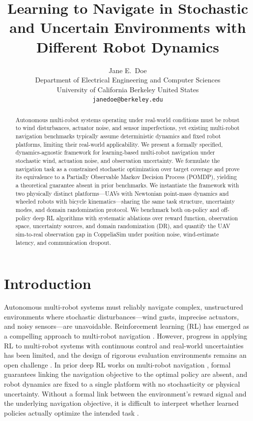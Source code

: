 \documentclass{article}
\title{Learning to Navigate in Stochastic and Uncertain Environments with Different Robot Dynamics}
\author{
  Jane E.~Doe\\
  Department of Electrical Engineering and Computer Sciences\\
  University of California Berkeley
  United States\\
  \texttt{janedoe@berkeley.edu} \\
}
\begin{document}
\maketitle
\thispagestyle{empty}
\pagestyle{empty}


\begin{abstract}
Autonomous multi-robot systems operating under real-world conditions must be robust to wind disturbances, actuator noise, and sensor imperfections, yet existing multi-robot navigation benchmarks typically assume deterministic dynamics and fixed robot platforms, limiting their real-world applicability. We present a formally specified, dynamics-agnostic framework for learning-based multi-robot navigation under stochastic wind, actuation noise, and observation uncertainty. We formulate the navigation task as a constrained stochastic optimization over target coverage and prove its equivalence to a Partially Observable Markov Decision Process (POMDP), yielding a theoretical guarantee absent in prior benchmarks. We instantiate the framework with two physically distinct platforms---UAVs with Newtonian point-mass dynamics and wheeled robots with bicycle kinematics---sharing the same task structure, uncertainty modes, and domain randomization protocol. We benchmark both on-policy and off-policy deep RL algorithms with systematic ablations over reward function, observation space, uncertainty sources, and domain randomization (DR), and quantify the UAV sim-to-real observation gap in CoppeliaSim under position noise, wind-estimate latency, and communication dropout.
\end{abstract}


\section{Introduction}

Autonomous multi-robot systems must reliably navigate complex, unstructured environments where stochastic disturbances---wind gusts, imprecise actuators, and noisy sensors---are unavoidable. Reinforcement learning (RL) has emerged as a compelling approach to multi-robot navigation \citep{chen2017icra, everett2018iros, fan2020ijrr}. However, progress in applying RL to multi-robot systems with continuous control and real-world uncertainties has been limited, and the design of rigorous evaluation environments remains an open challenge \citep{henderson2018deep, reda2020learning, dulacArnold2021}. In prior deep RL works on multi-robot navigation \citep{chen2017icra, everett2018iros, fan2020ijrr, long2017iral, han2022iral}, formal guarantees linking the navigation objective to the optimal policy are absent, and robot dynamics are fixed to a single platform with no stochasticity or physical uncertainty. Without a formal link between the environment's reward signal and the underlying navigation objective, it is difficult to interpret whether learned policies actually optimize the intended task \citep{reda2020learning, dulac2020empirical}.
\end{document}
